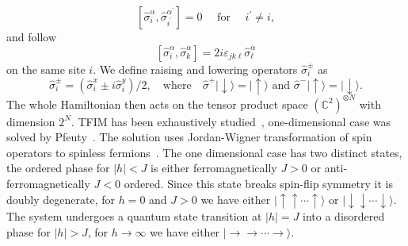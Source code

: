 \begin{equation}
	\left[\hat{\sigma}_{i}^{\alpha}, \hat{\sigma}_{i^{\prime}}^{\alpha^{\prime}}\right]=0 \quad \text { for } \quad i^{\prime} \neq i, 
\end{equation}
and follow 
\begin{equation}
	\left[\hat \sigma^\alpha_{i}, \hat \sigma^\alpha_{k}\right]=2 i \varepsilon_{j k \ell} \hat \sigma^\alpha_{\ell}
\end{equation}
on the same site $i$. We define raising and lowering operators $\hat{\sigma}_{i}^{\pm}$ as
\begin{equation}
\hat{\sigma}_{i}^{\pm} = \left(\hat{\sigma}_{i}^{x} \pm i \hat{\sigma}_{i}^{y}\right) / 2, \quad \text{where} \quad \hat{\sigma}^{+}|\downarrow\rangle=|\uparrow\rangle \text { and } \hat{\sigma}^{-}|\uparrow\rangle=|\downarrow\rangle.
\end{equation}
The whole Hamiltonian then acts on the tensor product space $\left(\mathbb{C}^{2}\right)^{\otimes N}$ with dimension $2^N$. TFIM has been exhaustively studied~\cite{stinchcombe1973isingI, stinchcombe1973isingII}, one-dimensional case was solved by Pfeuty~\cite{pfeuty1970one}. The solution uses Jordan-Wigner transformation of spin operators to spinless fermions~\cite{lieb1961two, niemeijer1967some}. The one dimensional case has two distinct states, the ordered phase for $|h| < J$ is either ferromagnetically $J > 0$ or anti-ferromagnetically $J < 0$ ordered. Since this state breaks spin-flip symmetry it is doubly degenerate, for $h=0$ and $J>0$ we have either $|\uparrow \uparrow \cdots \uparrow \rangle$ or $|\downarrow \downarrow \cdots \downarrow \rangle$. The system undergoes a quantum state transition at $|h| = J$ into a disordered phase for $|h| > J$, for $h \rightarrow \infty$ we have either $|\rightarrow \rightarrow \cdots \rightarrow \rangle$. 


